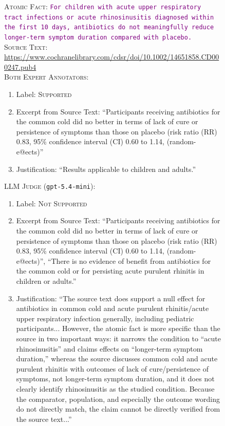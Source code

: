 \documentclass{article}
\begin{document}
\begin{figure}[h!]
\centering
\begin{small}
\begin{tcolorbox}[colback=gray!5, colframe=red, width=\textwidth]
\textsc{Atomic Fact:} \texttt{\textcolor{purple}{For children with acute upper respiratory tract infections or acute rhinosinusitis diagnosed within the first 10 days, antibiotics do not meaningfully reduce longer-term symptom duration compared with placebo.}}\\
\textsc{Source Text:} {\footnotesize\url{https://www.cochranelibrary.com/cdsr/doi/10.1002/14651858.CD000247.pub4}}\\

\textsc{Both Expert Annotators:} 
\begin{enumerate}[leftmargin=0.6cm]
\item Label:  \textsc{Supported}
\item Excerpt from Source Text:  ``Participants receiving antibiotics for the common cold did no better in terms of lack of cure or persistence of symptoms than those on placebo (risk ratio (RR) 0.83, 95\% confidence interval (CI) 0.60 to 1.14, (random-e@ects)''
\item Justification: ``Results applicable to children and adults.''
\end{enumerate}
\vspace{2mm}
\textsc{LLM Judge} (\texttt{gpt-5.4-mini}): 
\begin{enumerate}[leftmargin=0.6cm]
\item Label:  \textsc{Not Supported}
\item Excerpt from Source Text:  ``Participants receiving antibiotics for the common cold did no better in terms of lack of cure or persistence of symptoms than those on placebo (risk ratio (RR) 0.83, 95\% confidence interval (CI) 0.60 to 1.14, (random-e@ects)'', ``There is no evidence of benefit from antibiotics for the common cold or for persisting acute purulent rhinitis in children or adults.''
\item Justification: ``The source text does support a null effect for antibiotics in common cold and acute purulent rhinitis/acute upper respiratory infection generally, including pediatric participants... However, the atomic fact is more specific than the source in two important ways: it narrows the condition to ``acute rhinosinusitis'' and claims effects on ``longer-term symptom duration,'' whereas the source discusses common cold and acute purulent rhinitis with outcomes of lack of cure/persistence of symptoms, not longer-term symptom duration, and it does not clearly identify rhinosinusitis as the studied condition. Because the comparator, population, and especially the outcome wording do not directly match, the claim cannot be directly verified from the source text...''

\end{enumerate}
\end{tcolorbox}
\end{small}
\end{figure}
\end{document}
